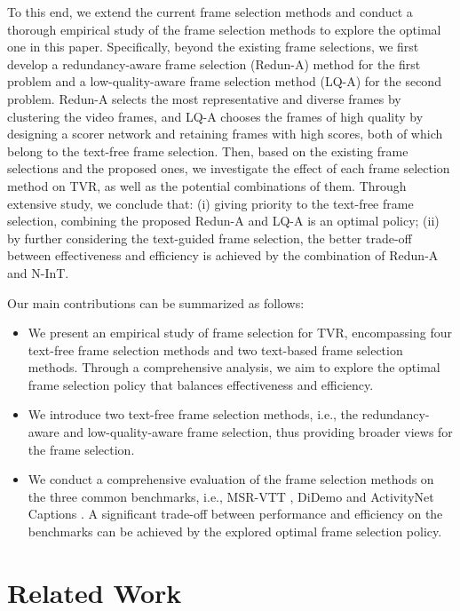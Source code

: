 \documentclass[11pt]{article}
\begin{document}
To this end, we extend the current frame selection methods and conduct a thorough empirical study of the frame selection methods to explore the optimal one in this paper.
Specifically, beyond the existing frame selections, we first develop a redundancy-aware frame selection (Redun-A) method for the first problem and a low-quality-aware frame selection method (LQ-A) for the second problem.
Redun-A selects the most representative and diverse frames by clustering the video frames, and LQ-A chooses the frames of high quality by designing a scorer network and retaining frames with high scores, both of which belong to the text-free frame selection.
Then, based on the existing frame selections and the proposed ones, we investigate the effect of each frame selection method on TVR, as well as the potential combinations of them.
Through extensive study, we conclude that: (i) giving priority to the text-free frame selection, combining the proposed Redun-A and LQ-A is an optimal policy; (ii) by further considering the text-guided frame selection, the better trade-off between effectiveness and efficiency is achieved by the combination of Redun-A and N-InT.

Our main contributions can be summarized as follows:
\begin{itemize}
    \item 
    We present an empirical study of frame selection for TVR, encompassing four text-free frame selection methods and two text-based frame selection methods. 
    Through a comprehensive analysis, we aim to explore the optimal frame selection policy that balances effectiveness and efficiency.
    \item We introduce two text-free frame selection methods, i.e., the redundancy-aware and low-quality-aware frame selection, thus providing broader views for the frame selection.   
    \item We conduct a comprehensive evaluation of the frame selection methods on the three common benchmarks, i.e., MSR-VTT \cite{xu2016msr}, DiDemo \cite{anne2017localizing} and ActivityNet Captions \cite{caba2015activitynet}. 
    A significant trade-off between performance and efficiency on the benchmarks can be achieved by the explored optimal frame selection policy.
\end{itemize}

\section{Related Work}
\end{document}
